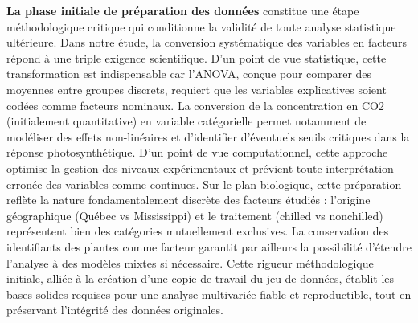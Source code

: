 \documentclass[
]{article}
\newenvironment{Shaded}{\begin{snugshade}}{\end{snugshade}}
\newcommand{\CommentTok}[1]{\textcolor[rgb]{0.56,0.35,0.01}{\textit{#1}}}
\newcommand{\FunctionTok}[1]{\textcolor[rgb]{0.13,0.29,0.53}{\textbf{#1}}}
\newcommand{\NormalTok}[1]{#1}
\newcommand{\OtherTok}[1]{\textcolor[rgb]{0.56,0.35,0.01}{#1}}
\newcommand{\SpecialCharTok}[1]{\textcolor[rgb]{0.81,0.36,0.00}{\textbf{#1}}}
\begin{document}
\begin{Shaded}
\end{Shaded}

\textbf{La phase initiale de préparation des données} constitue une
étape méthodologique critique qui conditionne la validité de toute
analyse statistique ultérieure. Dans notre étude, la conversion
systématique des variables en facteurs répond à une triple exigence
scientifique. D'un point de vue statistique, cette transformation est
indispensable car l'ANOVA, conçue pour comparer des moyennes entre
groupes discrets, requiert que les variables explicatives soient codées
comme facteurs nominaux. La conversion de la concentration en CO2
(initialement quantitative) en variable catégorielle permet notamment de
modéliser des effets non-linéaires et d'identifier d'éventuels seuils
critiques dans la réponse photosynthétique. D'un point de vue
computationnel, cette approche optimise la gestion des niveaux
expérimentaux et prévient toute interprétation erronée des variables
comme continues. Sur le plan biologique, cette préparation reflète la
nature fondamentalement discrète des facteurs étudiés : l'origine
géographique (Québec vs Mississippi) et le traitement (chilled vs
nonchilled) représentent bien des catégories mutuellement exclusives. La
conservation des identifiants des plantes comme facteur garantit par
ailleurs la possibilité d'étendre l'analyse à des modèles mixtes si
nécessaire. Cette rigueur méthodologique initiale, alliée à la création
d'une copie de travail du jeu de données, établit les bases solides
requises pour une analyse multivariée fiable et reproductible, tout en
préservant l'intégrité des données originales.
\end{document}

